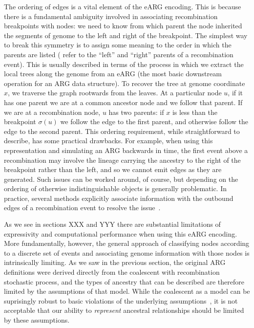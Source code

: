 \documentclass{article}
\begin{document}
The ordering of edges is a vital element of the eARG encoding.
This is because there is a fundamental ambiguity involved
in associating recombination breakpoints with nodes:
we need to know from which parent the node inherited
the segments of genome to the left and right of the breakpoint.
The simplest way to break this symmetry is to assign
some meaning to the order in which the parents are listed
(\cite{griffiths1997ancestral} refer to the ``left'' and ``right''
parents of a recombination event). This is usually described
in terms of the process in which we extract the local trees
along the genome from an eARG (the most basic downstream
operation for an ARG data structure).
To recover the tree at genome coordinate $x$,
we traverse the graph rootwards from the leaves.
At a particular
node $u$, if it has one parent we are at a common ancestor
node and we follow that parent. If we are at a
recombination node, $u$ has two parents: if
$x$ is less than the breakpoint $\sigma(u)$ we follow
the edge to the first parent, and otherwise follow the edge
to the second parent.
This ordering requirement, while straightforward
to describe, has some practical drawbacks. For example,
when using this representation and simulating an ARG backwards in time,
the first event above a recombination may involve the lineage carrying the
ancestry to the right of the breakpoint rather
than the left, and so we cannot emit edges as they are generated.
Such issues can be worked around, of course, but depending on the ordering of
otherwise indistinguishable objects is generally problematic. In practice,
several methods explicitly associate information with the outbound edges
of a recombination event
to resolve the issue~\citep{lyngso2005minimum,ignatieva2021kwarg}.

As we see in sections XXX and YYY there are substantial limitations
of expressivity and computational performance when using this eARG
encoding. More fundamentally, however, the general approach
of classifying nodes according to a discrete set of events
and associating genome information with those nodes is intrinsically
limiting. As we saw in the previous section, the original ARG
definitions were derived directly from the coalescent with recombination
stochastic process, and the types of ancestry that can be
described are therefore limited by the assumptions of that
model. While the coalescent as a model can be suprisingly robust to
basic violations of the underlying assumptions~\citep{
wakeley2012gene,bhaskar2014distortion,nelson2020accounting},
it is not acceptable that our ability to \emph{represent}
ancestral relationships should be limited by these assumptions.
\end{document}
